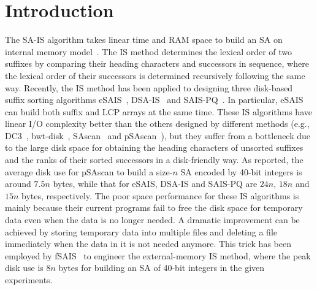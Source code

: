 \documentclass[10pt,journal,compsoc]{IEEEtran}
\begin{document}
\IEEEpeerreviewmaketitle


\section{Introduction}\label{sec:introduction}

The SA-IS algorithm takes linear time and RAM space to build an SA on internal memory model~\cite{Nong11}. The IS method determines the lexical order of two suffixes by comparing their heading characters and successors in sequence, where the lexical order of their successors is determined recursively following the same way. 
Recently, the IS method has been applied to designing three disk-based suffix sorting algorithms eSAIS~\cite{Bingmann12}, DSA-IS~\cite{Nong15} and SAIS-PQ~\cite{Liu15}. In particular, eSAIS can build both suffix and LCP arrays at the same time. 
These IS algorithms have linear I/O complexity better than the others designed by different methods (e.g., DC3~\cite{Dementiev2008a}, bwt-disk~\cite{Ferragina2012}, SAscan~\cite{Karkkainen2014} and pSAscan~\cite{Karkkainen2015}), but they suffer from a bottleneck due to the large disk space for obtaining the heading characters of unsorted suffixes and the ranks of their sorted successors in a disk-friendly way. 
As reported, the average disk use for pSAscan to build a size-$n$ SA encoded by 40-bit integers is around $7.5n$ bytes, while that for eSAIS, DSA-IS and SAIS-PQ are $24n$, $18n$ and $15n$ bytes, respectively. 
The poor space performance for these IS algorithms is mainly because their current programs fail to free the disk space for temporary data even when the data is no longer needed. 
A dramatic improvement can be achieved by storing temporary data into multiple files and deleting a file immediately when the data in it is not needed anymore. This trick has been employed by fSAIS~\cite{Karkkainen2017} to engineer the external-memory IS method, where the peak disk use is $8n$ bytes for building an SA of 40-bit integers in the given experiments. 
\end{document}
